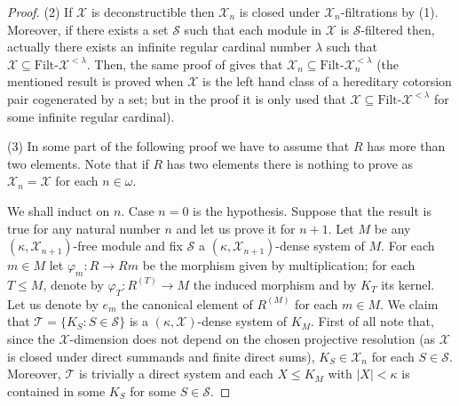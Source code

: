 \documentclass[a4paper,10pt]{amsart}
\begin{document}
\begin{proof}
  (2) If $\mathcal X$ is deconstructible then $\mathcal X_n$ is closed
  under $\mathcal X_n$-filtrations by (1). Moreover, if there exists a
  set $\mathcal S$ such that each module in $\mathcal X$ is $\mathcal
  S$-filtered then, actually there exists an infinite regular cardinal
  number $\lambda$ such that $\mathcal X \subseteq {\textrm{Filt-}} \mathcal X^{<
    \lambda}$. Then, the same proof of \cite[Theorem
  2.2]{EstradaGuilIzurdiaga} gives that $\mathcal X_n \subseteq {\textrm{Filt-}}
  \mathcal X_n^{< \lambda}$ (the mentioned result is proved when
  $\mathcal X$ is the left hand class of a hereditary cotorsion pair
  cogenerated by a set; but in the proof it is only used that
  $\mathcal X \subseteq {\textrm{Filt-}} \mathcal X^{< \lambda}$ for some
  infinite regular cardinal).

  (3) In some part of the following proof we have to assume that $R$
  has more than two elements. Note that if $R$ has two elements there
  is nothing to prove as $\mathcal X_n = \mathcal X$ for each $n \in
  \omega$.

  We shall induct on $n$. Case $n=0$ is the hypothesis. Suppose that
  the result is true for any natural number $n$ and let us prove it
  for $n+1$. Let $M$ be any $(\kappa,\mathcal X_{n+1})$-free module
  and fix $\mathcal S$ a $(\kappa,\mathcal X_{n+1})$-dense system of
  $M$. For each $m \in M$ let $\varphi_m:R \rightarrow Rm$ be the
  morphism given by multiplication; for each $T \leq M$, denote by
  $\varphi_T:R^{(T)} \rightarrow M$ the induced morphism and by $K_T$
  its kernel. Let us denote by $e_m$ the canonical element of
  $R^{(M)}$ for each $m \in M$. We claim that $\mathcal T = \{K_S:S
  \in \mathcal S\}$ is a $(\kappa,\mathcal X)$-dense system of
  $K_M$. First of all note that, since the $\mathcal X$-dimension does not
  depend on the chosen projective resolution (as $\mathcal X$ is
  closed under direct summands and finite direct sums), $K_{
    S} \in \mathcal X_n$ for each $ S \in \mathcal
  S$. Moreover, $\mathcal T$ is trivially a direct system and each $X
  \leq K_M$ with $|X| < \kappa$ is contained in some $K_S$ for some $S
  \in \mathcal S$.


\end{proof}
\end{document}
